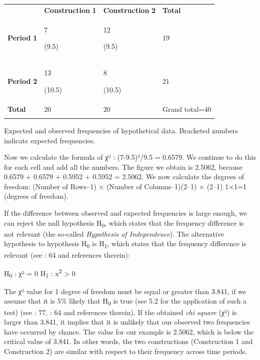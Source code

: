 \begin{table}
\begin{tabularx}{\textwidth}{XXXX}
\lsptoprule
\multicolumn{1}{c}{} & \textbf{Construction} \textbf{1} & \textbf{Construction} \textbf{2} & \textbf{Total}\\
\textbf{Period} \textbf{1} & { 7}

 (9.5) & { 12}

 (9.5) & 19\\
\textbf{Period} \textbf{2} & { 13}

 (10.5) & { 8}

 (10.5) & 21\\
\textbf{Total} & 20 & 20 & Grand total=40\\
\lspbottomrule
\end{tabularx}
{\caption{\label{tab:} ~}Expected and observed frequencies of hypothetical data. Bracketed numbers indicate expected frequencies.}
\end{table}

Now we calculate the formula of χ² : (7-9.5)²/9.5 = 0.6579. We continue to do this for each cell and add all the numbers. The figure we obtain is 2.5062, because 0.6579 + 0.6579 + 0.5952 + 0.5952 = 2.5062. We now calculate the degrees of freedom: (Number of Rows–1) × (Number of Columns–1)(2–1) × (2–1) 1×1=1 (degrees of freedom).

  If the difference between observed and expected frequencies is large enough, we can reject the null hypothesis H\textsubscript{0}, which states that the frequency difference is not relevant (the so-called \textit{Hypothesis of Independence}). The alternative hypothesis to hypothesis H\textsubscript{0} is H\textsubscript{1}, which states that the frequency difference is relevant (see \citealt{Author2018}: 64 and references therein): 

  H\textsubscript{0} : χ² = 0 H\textsubscript{1} : x\textsuperscript{2} > 0

  The χ² value for 1 degree of freedom must be equal or greater than 3.841, if we assume that it is 5\% likely that H\textsubscript{0} is true (see 5.2 for the application of such a test) (see \citealt{Baayen2008}: 77, \citealt{Author2018}: 64 and references therein). If the obtained \textit{chi square} (χ²) is larger than 3.841, it implies that it is unlikely that our observed two frequencies have occurred by chance. The value for our example is 2.5062, which is below the critical value of 3.841. In other words, the two constructions (Construction 1 and Construction 2) are similar with respect to their frequency across time periods. 

